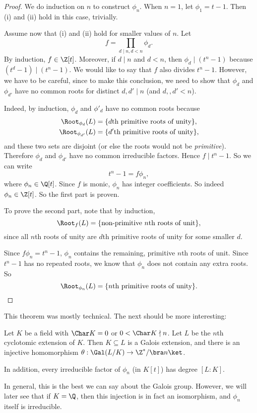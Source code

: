 \documentclass[a4paper]{article}
\begin{document}
\begin{proof}
  We do induction on $n$ to construct $\phi_n$. When $n = 1$, let $\phi_1 = t - 1$. Then (i) and (ii) hold in this case, trivially.

  Assume now that (i) and (ii) hold for smaller values of $n$. Let
  \[
    f = \prod_{d \mid n, d < n} \phi_d.
  \]
  By induction, $f \in \Z[t]$. Moreover, if $d \mid n$ and $d < n$, then $\phi_d \mid (t^n - 1)$ because $(t^d - 1) \mid (t^n - 1)$. We would like to say that $f$ also divides $t^n - 1$. However, we have to be careful, since to make this conclusion, we need to show that $\phi_d$ and $\phi_{d'}$ have no common roots for distinct $d, d' \mid n$ (and $d, ,d' < n$).

  Indeed, by induction, $\phi_d$ and $\phi'_d$ have no common roots because
  \begin{align*}
    \Root_{\phi_d}(L) &= \{d\text{th primitive roots of unity}\},\\
    \Root_{\phi_{d'}}(L) &= \{d'\text{th primitive roots of unity}\},
  \end{align*}
  and these two sets are disjoint (or else the roots would not be \emph{primitive}). Therefore $\phi_d$ and $\phi_{d'}$ have no common irreducible factors. Hence $f \mid t^n - 1$. So we can write
  \[
    t^n - 1 = f \phi_n,
  \]
  where $\phi_n \in \Q[t]$. Since $f$ is monic, $\phi_n$ has integer coefficients. So indeed $\phi_n \in \Z[t]$. So the first part is proven.

  To prove the second part, note that by induction,
  \[
    \Root_f(L) = \{\text{non-primitive }n\text{th roots of unit}\},
  \]
  since all $n$th roots of unity are $d$th primitive roots of unity for some smaller $d$.

  Since $f \phi_n = t^n - 1$, $\phi_n$ contains the remaining, primitive $n$th roots of unit. Since $t^n - 1$ has no repeated roots, we know that $\phi_n$ does not contain any extra roots. So
  \[
    \Root_{\phi_n}(L) = \{n\text{th primitive roots of unity}\}.
  \]
\end{proof}

This theorem was mostly technical. The next should be more interesting:
\begin{thm}
  Let $K$ be a field with $\Char K = 0$ or $0 < \Char K \nmid n$. Let $L$ be the $n$th cyclotomic extension of $K$. Then $K\subseteq L$ is a Galois extension, and there is an injective homomorphism $\theta: \Gal(L/K) \to \Z^*/\bra n\ket$.

  In addition, every irreducible factor of $\phi_n$ (in $K[t]$) has degree $[L:K]$.
\end{thm}
In general, this is the best we can say about the Galois group. However, we will later see that if $K = \Q$, then this injection is in fact an isomorphism, and $\phi_n$ itself is irreducible.
\end{document}
